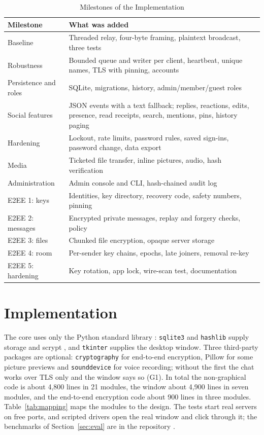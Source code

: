 \documentclass[conference]{IEEEtran}
\newcommand{\code}[1]{\texttt{#1}}
\begin{document}
\begin{table}[t]
\centering
\caption{Milestones of the Implementation}
\label{tab:stages}
\footnotesize
\begin{tabularx}{\columnwidth}{@{}>{\raggedright\arraybackslash}p{2.2cm} Y@{}}
\toprule
\textbf{Milestone} & \textbf{What was added} \\
\midrule
Baseline & Threaded relay, four-byte framing, plaintext broadcast, three tests \\
Robustness & Bounded queue and writer per client, heartbeat, unique names, TLS with pinning, accounts \\
Persistence and roles & SQLite, migrations, history, admin/member/guest roles \\
Social features & JSON events with a text fallback; replies, reactions, edits, presence, read receipts, search, mentions, pins, history paging \\
Hardening & Lockout, rate limits, password rules, saved sign-ins, password change, data export \\
Media & Ticketed file transfer, inline pictures, audio, hash verification \\
Administration & Admin console and CLI, hash-chained audit log \\
E2EE 1: keys & Identities, key directory, recovery code, safety numbers, pinning \\
E2EE 2: messages & Encrypted private messages, replay and forgery checks, policy \\
E2EE 3: files & Chunked file encryption, opaque server storage \\
E2EE 4: room & Per-sender key chains, epochs, late joiners, removal re-key \\
E2EE 5: hardening & Key rotation, app lock, wire-scan test, documentation \\
\bottomrule
\end{tabularx}
\end{table}

\section{Implementation}\label{sec:impl}
The core uses only the Python standard library \cite{pysocket,pythreading,pystruct,pyssl}: \code{sqlite3} and \code{hashlib} supply storage and scrypt \cite{pysqlite,pyhashlib}, and \code{tkinter} supplies the desktop window. Three third-party packages are optional: \code{cryptography} for end-to-end encryption, Pillow for some picture previews and \code{sounddevice} for voice recording; without the first the chat works over TLS only and the window says so (G1). In total the non-graphical code is about 4,800 lines in 21 modules, the window about 4,900 lines in seven modules, and the end-to-end encryption code about 900 lines in three modules. Table~\ref{tab:mapping} maps the modules to the design. The tests start real servers on free ports, and scripted drivers open the real window and click through it; the benchmarks of Section~\ref{sec:eval} are in the repository \cite{lanchatrepo}.
\end{document}
